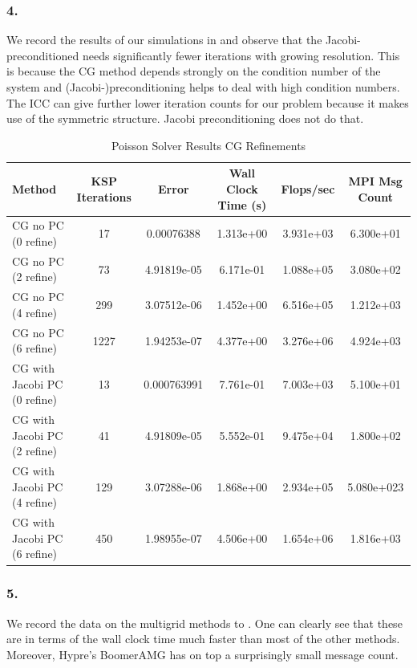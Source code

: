 \subsubsection*{4.}
\FloatBarrier
We record the results of our simulations in  and observe that the Jacobi-preconditioned needs significantly fewer iterations with growing resolution. This is because the CG method depends strongly on the condition number of the system and (Jacobi-)preconditioning helps to deal with high condition numbers. The ICC can give further lower iteration counts for our problem because it makes use of the symmetric structure. Jacobi preconditioning does not do that.

\begin{table}[h!]
\hspace{-2.5cm}\begin{tabular}{lccccc}
\hline
\textbf{Method} & \textbf{KSP Iterations} & \textbf{Error} & \textbf{Wall Clock Time (s)} & \textbf{Flops/sec} & \textbf{MPI Msg Count} \\
\hline
CG no PC (0 refine) & 17 & 0.00076388 & 1.313e+00 & 3.931e+03 & 6.300e+01  \\
CG no PC (2 refine) & 73 & 4.91819e-05 & 6.171e-01 & 1.088e+05 & 3.080e+02  \\
CG no PC (4 refine) & 299 & 3.07512e-06 & 1.452e+00  & 6.516e+05 & 1.212e+03 \\
CG no PC (6 refine) & 1227 & 1.94253e-07 & 4.377e+00 & 3.276e+06 & 4.924e+03 \\
\hline
CG with Jacobi PC (0 refine) & 13 & 0.000763991 & 7.761e-01 & 7.003e+03  & 5.100e+01  \\
CG with Jacobi PC (2 refine) & 41 & 4.91809e-05 & 5.552e-01 & 9.475e+04 & 1.800e+02  \\
CG with Jacobi PC (4 refine) & 129 & 3.07288e-06 & 1.868e+00  &2.934e+05  & 5.080e+023 \\
CG with Jacobi PC (6 refine) & 450 & 1.98955e-07 & 4.506e+00 & 1.654e+06 & 1.816e+03 \\
\hline
\end{tabular}
\caption{Poisson Solver Results CG Refinements}
\label{tab:ex5.4}
\end{table}

\FloatBarrier



\subsubsection*{5.}
\FloatBarrier
We record the data on the multigrid methods to . One can clearly see that these are in terms of the wall clock time much faster than most of the other methods. Moreover, Hypre's BoomerAMG has on top a surprisingly small message count.

